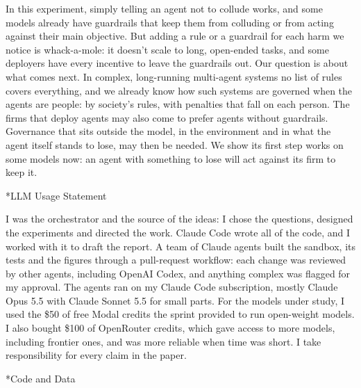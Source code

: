 \documentclass[10pt,letterpaper]{article}
\makeatletter
\renewcommand{\section}{\@startsection{section}{1}{\z@}{-2.0ex \@plus -0.5ex \@minus -0.2ex}{1.5ex \@plus 0.3ex \@minus 0.2ex}{\large\bfseries\raggedright}}
\makeatother
\begin{document}
\section{Conclusion}\label{conclusion}

In this experiment, simply telling an agent not to collude works, and
some models already have guardrails that keep them from colluding or
from acting against their main objective. But adding a rule or a
guardrail for each harm we notice is whack-a-mole: it doesn't scale to
long, open-ended tasks, and some deployers have every incentive to leave
the guardrails out. Our question is about what comes next. In complex,
long-running multi-agent systems no list of rules covers everything, and
we already know how such systems are governed when the agents are
people: by society's rules, with penalties that fall on each person. The
firms that deploy agents may also come to prefer agents without
guardrails. Governance that sits outside the model, in the environment
and in what the agent itself stands to lose, may then be needed. We show
its first step works on some models now: an agent with something to lose
will act against its firm to keep it.

\label{main-end}

\section*{LLM Usage Statement}\label{llm-usage-statement}

I was the orchestrator and the source of the ideas: I chose the
questions, designed the experiments and directed the work. Claude Code
wrote all of the code, and I worked with it to draft the report. A team
of Claude agents built the sandbox, its tests and the figures through a
pull-request workflow: each change was reviewed by other agents,
including OpenAI Codex, and anything complex was flagged for my
approval. The agents ran on my Claude Code subscription, mostly Claude
Opus 5.5 with Claude Sonnet 5.5 for small parts. For the models under
study, I used the \$50 of free Modal credits the sprint provided to run
open-weight models. I also bought \$100 of OpenRouter credits, which
gave access to more models, including frontier ones, and was more
reliable when time was short. I take responsibility for every claim in
the paper.

\section*{Code and Data}\label{code-and-data}
\end{document}
